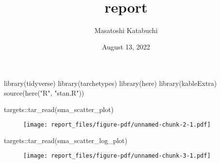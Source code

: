 \documentclass[
  11pt,
  letterpaper,
  DIV=11,
  numbers=noendperiod]{scrartcl}
\title{report}
\author{Masatoshi Katabuchi}
\date{August 13, 2022}
\newenvironment{Shaded}{}{}
\newcommand{\FunctionTok}[1]{\textcolor[rgb]{0.44,0.26,0.76}{#1}}
\newcommand{\NormalTok}[1]{\textcolor[rgb]{0.14,0.16,0.18}{#1}}
\newcommand{\SpecialCharTok}[1]{\textcolor[rgb]{0.00,0.36,0.77}{#1}}
\newcommand{\StringTok}[1]{\textcolor[rgb]{0.01,0.18,0.38}{#1}}
\renewcommand*\contentsname{Table of contents}
\newcommand\contentsname{Table of contents}
\begin{document}
\maketitle
\ifdefined\Shaded\renewenvironment{Shaded}{\begin{tcolorbox}[boxrule=0pt, sharp corners, borderline west={3pt}{0pt}{shadecolor}, interior hidden, enhanced, breakable, frame hidden]}{\end{tcolorbox}}\fi

\renewcommand*\contentsname{Table of contents}
{
\hypersetup{linkcolor=}
\setcounter{tocdepth}{3}
\tableofcontents
}
\begin{Shaded}
\begin{Highlighting}[]
\FunctionTok{library}\NormalTok{(tidyverse)}
\FunctionTok{library}\NormalTok{(tarchetypes)}
\FunctionTok{library}\NormalTok{(here)}
\FunctionTok{library}\NormalTok{(kableExtra)}
\FunctionTok{source}\NormalTok{(}\FunctionTok{here}\NormalTok{(}\StringTok{"R"}\NormalTok{, }\StringTok{"stan.R"}\NormalTok{))}
\end{Highlighting}
\end{Shaded}

\begin{Shaded}
\begin{Highlighting}[]
\NormalTok{targets}\SpecialCharTok{::}\FunctionTok{tar\_read}\NormalTok{(sma\_scatter\_plot)}
\end{Highlighting}
\end{Shaded}

\begin{figure}[H]

{\centering \texttt{[image: report\_files/figure-pdf/unnamed-chunk-2-1.pdf]}

}

\end{figure}

\begin{Shaded}
\begin{Highlighting}[]
\NormalTok{targets}\SpecialCharTok{::}\FunctionTok{tar\_read}\NormalTok{(sma\_scatter\_log\_plot)}
\end{Highlighting}
\end{Shaded}

\begin{figure}[H]

{\centering \texttt{[image: report\_files/figure-pdf/unnamed-chunk-3-1.pdf]}

}

\end{figure}
\end{document}
